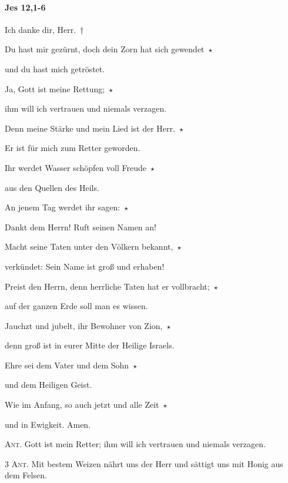 \paragraph{Jes 12,1-6}

\noindent Ich danke dir, Herr.~†~\nopagebreak

Du hast mir gezürnt, doch dein Zorn hat sich gewendet~$\star$~\nopagebreak

und du hast mich getröstet.

\noindent Ja, Gott ist meine Rettung;~$\star$~\nopagebreak

ihm will ich vertrauen und niemals verzagen.

\noindent Denn meine Stärke und mein Lied ist der Herr.~$\star$~\nopagebreak

Er ist für mich zum Retter geworden.

\noindent Ihr werdet Wasser schöpfen voll Freude~$\star$~\nopagebreak

aus den Quellen des Heils.

\noindent An jenem Tag werdet ihr sagen:~$\star$~\nopagebreak

Dankt dem Herrn! Ruft seinen Namen an!

\noindent Macht seine Taten unter den Völkern bekannt,~$\star$~\nopagebreak

verkündet: Sein Name ist groß und erhaben!

\noindent Preist den Herrn, denn herrliche Taten hat er vollbracht;~$\star$~\nopagebreak

auf der ganzen Erde soll man es wissen.

\noindent Jauchzt und jubelt, ihr Bewohner von Zion,~$\star$~\nopagebreak

denn groß ist in eurer Mitte der Heilige Israels.

\noindent Ehre sei dem Vater und dem Sohn~$\star$~\nopagebreak

und dem Heiligen Geist.

\noindent Wie im Anfang, so auch jetzt und alle Zeit~$\star$~\nopagebreak

und in Ewigkeit. Amen.

\vspace{10pt}

\noindent \textsc{Ant.} Gott ist mein Retter; ihm will ich vertrauen und niemals verzagen. 

\vspace{10pt}

\noindent \textsc{3 Ant.} Mit bestem Weizen nährt uns der Herr und sättigt uns mit Honig aus dem Felsen.

